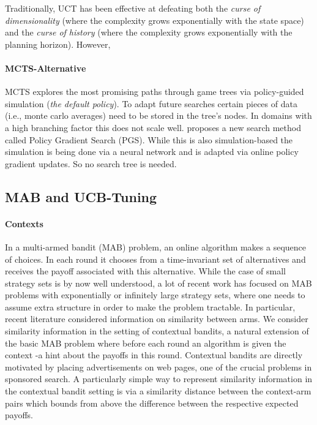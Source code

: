 Traditionally, UCT has been effective at defeating both the \textit{curse of dimensionality} (where the complexity grows exponentially with the state space) and the \textit{curse of history} (where the complexity grows exponentially with the planning horizon). However, 
\paragraph{MCTS-Alternative}
MCTS explores the most promising paths through game trees via policy-guided simulation (\textit{the default policy}). To adapt future searches certain pieces of data (i.e., monte carlo averages) need to be stored in the tree's nodes. In domains with a high branching factor this does not scale well. \cite{anthony2019policy} proposes a new search method called Policy Gradient Search (PGS). While this is also simulation-based the simulation is being done via a neural network and is adapted via online policy gradient updates. So no search tree is needed.
\subsection{MAB and UCB-Tuning}
\paragraph{Contexts} 
\cite{slivkins2014contextual}
In a multi-armed bandit (MAB) problem, an online algorithm makes a sequence of choices. In each round it chooses from a time-invariant set of alternatives and receives the payoff associated with this alternative. While the case of small strategy sets is by now well understood, a lot of recent work has focused on MAB problems with exponentially or infinitely large strategy sets, where one needs to assume extra structure in order to make the problem tractable. In particular, recent literature considered information on similarity between arms.
We consider similarity information in the setting of contextual bandits, a natural extension of the basic MAB problem where before each round an algorithm is given the context -a hint about the payoffs in this round. Contextual bandits are directly motivated by placing advertisements on web pages, one of the crucial problems in sponsored search. A particularly simple way to represent similarity information in the contextual bandit setting is via a similarity distance between the context-arm pairs which bounds from above the difference between the respective expected payoffs.
